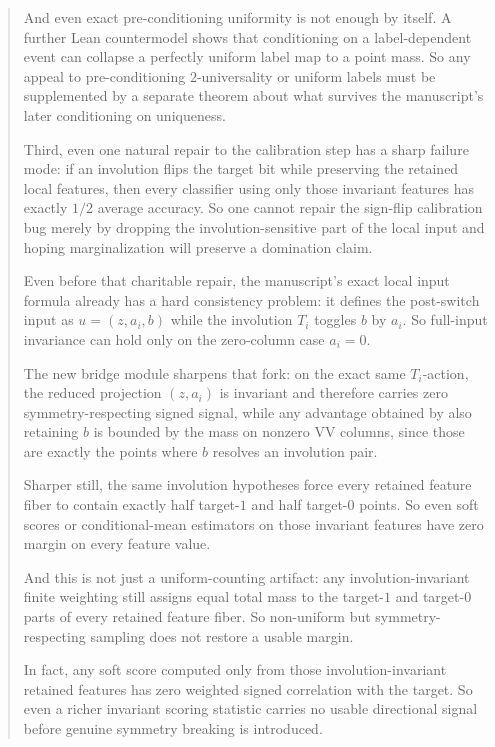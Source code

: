 \documentclass[11pt]{article}
\theoremstyle{remark}
\begin{document}
\begin{abstract}
And even exact pre-conditioning uniformity is not enough by itself.  A further Lean countermodel
shows that conditioning on a label-dependent event can collapse a perfectly uniform label map to a
point mass.  So any appeal to pre-conditioning \(2\)-universality or uniform labels must be
supplemented by a separate theorem about what survives the manuscript's later conditioning on
uniqueness.

Third, even one natural repair to the calibration step has a sharp failure mode: if an
involution flips the target bit while preserving the retained local features, then every
classifier using only those invariant features has exactly \(1/2\) average accuracy.  So one
cannot repair the sign-flip calibration bug merely by dropping the involution-sensitive part of
the local input and hoping marginalization will preserve a domination claim.

Even before that charitable repair, the manuscript's exact local input formula already has a hard
consistency problem: it defines the post-switch input as \(u=(z,a_i,b)\) while the involution
\(T_i\) toggles \(b\) by \(a_i\).  So full-input invariance can hold only on the zero-column case
\(a_i=0\).

The new bridge module sharpens that fork: on the exact same \(T_i\)-action, the reduced projection
\((z,a_i)\) is invariant and therefore carries zero symmetry-respecting signed signal, while any
advantage obtained by also retaining \(b\) is bounded by the mass on nonzero VV columns, since
those are exactly the points where \(b\) resolves an involution pair.

Sharper still, the same involution hypotheses force every retained feature fiber to contain
exactly half target-\(1\) and half target-\(0\) points.  So even soft scores or conditional-mean
estimators on those invariant features have zero margin on every feature value.

And this is not just a uniform-counting artifact: any involution-invariant finite weighting still
assigns equal total mass to the target-\(1\) and target-\(0\) parts of every retained feature
fiber.  So non-uniform but symmetry-respecting sampling does not restore a usable margin.

In fact, any soft score computed only from those involution-invariant retained features has zero
weighted signed correlation with the target.  So even a richer invariant scoring statistic carries
no usable directional signal before genuine symmetry breaking is introduced.


\end{abstract}
\end{document}

